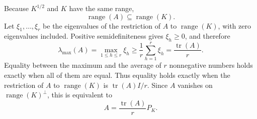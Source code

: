 Because \(K^{1/2}\) and \(K\) have the same range,
\[
\operatorname{range}(A)\subseteq\operatorname{range}(K).
\]
Let \(\xi_1,\ldots,\xi_r\) be the eigenvalues of the restriction of \(A\) to \(\operatorname{range}(K)\), with zero eigenvalues included. Positive semidefiniteness gives \(\xi_h\ge0\), and therefore
\[
\lambda_{\max}(A)=\max_{1\le h\le r}\xi_h
\ge \frac1r\sum_{h=1}^r\xi_h
=\frac{\operatorname{tr}(A)}r.
\]
Equality between the maximum and the average of \(r\) nonnegative numbers holds exactly when all of them are equal. Thus equality holds exactly when the restriction of \(A\) to \(\operatorname{range}(K)\) is \(\operatorname{tr}(A)I/r\). Since \(A\) vanishes on \(\operatorname{range}(K)^\perp\), this is equivalent to
\[
A=\frac{\operatorname{tr}(A)}rP_K.
\]
